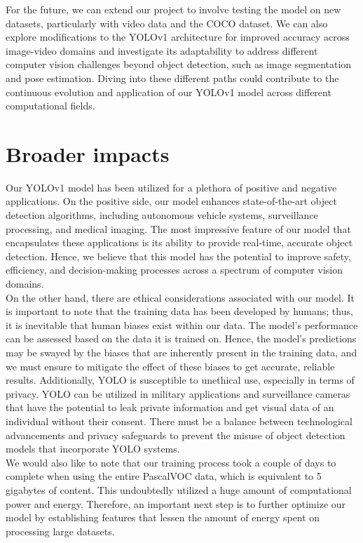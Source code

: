 \documentclass{article}
\begin{document}
For the future, we can extend our project to involve testing the model on new datasets, particularly with video data and the COCO dataset. We can also explore modifications to the YOLOv1 architecture for improved accuracy across image-video domains and investigate its adaptability to address different computer vision challenges beyond object detection, such as image segmentation and pose estimation. Diving into these different paths could contribute to the continuous evolution and application of our YOLOv1 model across different computational fields.


\section{Broader impacts}
Our YOLOv1 model has been utilized for a plethora of positive and negative applications. On the positive side, our model enhances state-of-the-art object detection algorithms, including autonomous vehicle systems, surveillance processing, and medical imaging. The most impressive feature of our model that encapsulates these applications is its ability to provide real-time, accurate object detection. Hence, we believe that this model has the potential to improve safety, efficiency, and decision-making processes across a spectrum of computer vision domains. \\

On the other hand, there are ethical considerations associated with our model. It is important to note that the training data has been developed by humans; thus, it is inevitable that human biases exist within our data. The model's performance can be assessed based on the data it is trained on. Hence, the model's predictions may be swayed by the biases that are inherently present in the training data, and we must ensure to mitigate the effect of these biases to get accurate, reliable results. Additionally, YOLO is susceptible to unethical use, especially in terms of privacy. YOLO can be utilized in military applications and surveillance cameras that have the potential to leak private information and get visual data of an individual without their consent. There must be a balance between technological advancements and privacy safeguards to prevent the misuse of object detection models that incorporate YOLO systems. \\

We would also like to note that our training process took a couple of days to complete when using the entire PascalVOC data, which is equivalent to 5 gigabytes of content. This undoubtedly utilized a huge amount of computational power and energy. Therefore, an important next step is to further optimize our model by establishing features that lessen the amount of energy spent on processing large datasets. \\
\end{document}
